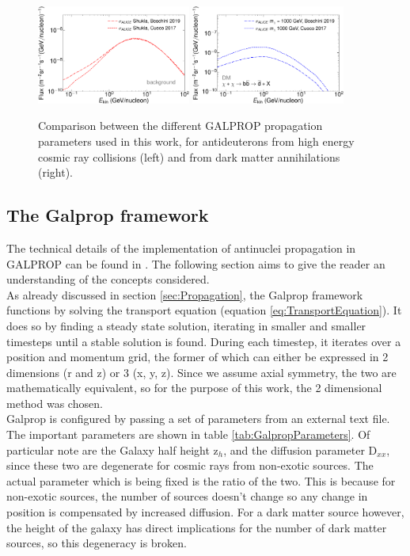 \begin{figure}
    \centering
    \includegraphics[width=0.45\textwidth]{figures/ComparisonPropagationBoschini.pdf}
    \includegraphics[width=0.45\textwidth]{figures/ComparisonPropagationBoschiniDM.pdf}
    \caption{Comparison between the different GALPROP propagation parameters used in this work, for antideuterons from high energy cosmic ray collisions (left) and from dark matter annihilations (right).}
    \label{fig:ComparisonPropagation}
\end{figure}

\subsection{The Galprop framework}\label{sec:GALPROP}
The technical details of the implementation of antinuclei propagation in GALPROP can be found in \cite{ALICE-PUBLIC-2022-002}. The following section aims to give the reader an understanding of the concepts considered.\\

As already discussed in section \ref{sec:Propagation}, the Galprop framework functions by solving the transport equation (equation \ref{eq:TransportEquation}). It does so by finding a steady state solution, iterating in smaller and smaller timesteps until a stable solution is found. During each timestep, it iterates over a position and momentum grid, the former of which can either be expressed in 2 dimensions (r and z) or 3 (x, y, z). Since we assume axial symmetry, the two are mathematically equivalent, so for the purpose of this work, the 2 dimensional method was chosen. \\

Galprop is configured by passing a set of parameters from an external text file. The important parameters are shown in table \ref{tab:GalpropParameters}. Of particular note are the Galaxy half height z$_h$, and the diffusion parameter D$_{xx}$, since these two are degenerate for cosmic rays from non-exotic sources. The actual parameter which is being fixed is the ratio of the two. This is because for non-exotic sources, the number of sources doesn't change so any change in position is compensated by increased diffusion. For a dark matter source however, the height of the galaxy has direct implications for the number of dark matter sources, so this degeneracy is broken.\\


